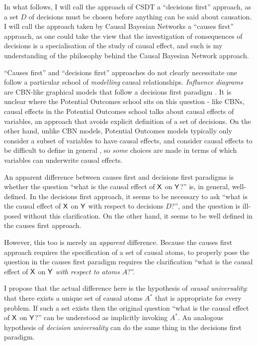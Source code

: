 In what follows, I will call the approach of CSDT a ``decisions first'' approach, as a set $D$ of decisions must be chosen before anything can be said about causation. I will call the approach taken by Causal Bayesian Networks a ``causes first'' approach, as one could take the view that the investigation of consequences of decisions is a specialisation of the study of causal effect, and such is my understanding of the philosophy behind the Causal Bayesian Network approach.

``Causes first'' and ``decisions first'' approaches do not clearly necessitate one follow a particular school of \emph{modelling} causal relationships. \emph{Influence diagrams} are CBN-like graphical models that follow a decisions first paradigm \citep{peters_elements_2017,woodward_causation_2016,dawid_influence_2002}. It is unclear where the Potential Outcomes school sits on this question - like CBNs, causal effects in the Potential Outcomes school talks about causal effects of variables, an approach that avoids explicit definition of a set of decisions. On the other hand, unlike CBN models, Potential Outcomes models typically only consider a subset of variables to have causal effects, and consider causal effects to be difficult to define in general \citep{rubin_causal_2005}, so \emph{some} choices are made in terms of which variables can underwrite causal effects.

An apparent difference between causes first and decisions first paradigms is whether the question ``what is the causal effect of $\mathsf{X}$ on $\mathsf{Y}$?'' is, in general, well-defined. In the decisions first approach, it seems to be necessary to ask ``what is the causal effect of $\mathsf{X}$ on $\mathsf{Y}$ with respect to decisions $D$?'', and the question is ill-posed without this clarification. On the other hand, it seems to be well defined in the causes first approach.

However, this too is merely an \emph{apparent} difference. Because the causes first approach requires the specification of a set of causal atoms, to properly pose the question in the causes first paradigm requires the clarification ``what is the causal effect of $\mathsf{X}$ on $\mathsf{Y}$ \emph{with respect to atoms $A$}?''.

I propose that the actual difference here is the hypothesis of \emph{causal universality}: that there exists a unique set of causal atoms $A^*$ that is appropriate for every problem. If such a set exists then the original question ``what is the causal effect of $\mathsf{X}$ on $\mathsf{Y}$?'' can be understood as implicitly invoking $A^*$. An analogous hypothesis of \emph{decision universality} can do the same thing in the decisions first paradigm.

